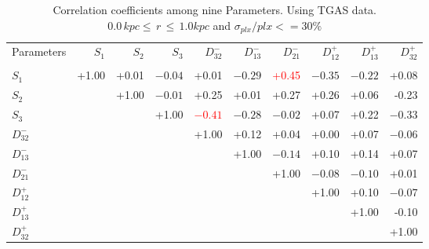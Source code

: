 \documentclass[onecolumn]{aa}   %
\newcommand{\hlgt}    {\textcolor{red}}
\begin{document}
 \begin{table}
\caption{Correlation coefficients among nine Parameters. Using TGAS data. $0.0\,kpc \le \,r \, \le \,1.0kpc$  and $\sigma_{plx}/plx<=30\%$ }
\label{tab: 9Par_coeff}
\begin{tabular}{l r r r r r r r r r }
\hline
Parameters 	&$S_1$ 	&$S_2$  	&$S_3$	&$D^-_{32}$	&$D^-_{13}$	&$D^-_{21}$	&$D^+_{12}$	&$D^+_{13}$	&$D^+_{32}$ \\
\\
\hline

$S_1$		&+1.00	&+0.01 	&$-0.04$  	&+0.01 	&$- 0.29$	&\hlgt{+0.45}	&$ -0.35$	
&$-0.22$	&+0.08 \\
$S_2$		&		&+1.00	&$-0.01$	&+0.25	&+0.01	&+0.27	&+0.26	&+0.06	
& -0.23 \\
$S_3$		&		&		&+1.00	&\hlgt{$-0.41$}	&$-0.28$	&$-0.02$	&+0.07	&+0.22	
&$-0.33$ \\
$D^-_{32}$	&		&		&		&+1.00	&+0.12	&+0.04	&+0.00	&+0.07	&$-0.06$ \\
$D^-_{13}$	&		&		&		&		&+1.00	&$-0.14$	&+0.10	&+0.14
&+0.07 \\
$D^-_{21}$	&		&		&		&		&		&+1.00	&$-0.08$	&$-0.10$
&+0.01 \\
$D^+_{12}$	&		&		&		&		&		&		&+1.00	&+0.10
&$-0.07$ \\
$D^+_{13}$	&		&		&		&		&		&		&		&+1.00
& -0.10 \\	
$D^+_{32}$	&		&		&		&		&		&		&		&
&+1.00 \\

\hline
\end{tabular}
 \end{table}
 
\end{document}
